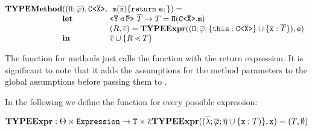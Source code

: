\documentclass[a4paper,USenglish,cleveref, autoref, thm-restate]{lipics-v2021}
\begin{document}
\begin{gather*}
\begin{array}{@{}l@{}l@{}l}
  \typeMethod & (\ensuremath{(\mv{\Pi} ; \overline{\fieldAssumption})}, \exptype{C}{\ol{X}},\ &\  \mathtt{m}(\ol{x})\{ \mathtt{ return }\ \texttt{e}; \}) =\\
              & \textbf{let} & \exptype{}{\ol{Y} \triangleleft \ol{P}}\ \overline{T} \to T  = \mv{\Pi} (\exptype{C}{\ol{X}}.\mv{m})
  \\
              & %
                                                                                              & ({R}, \constraints) =
                                                                                                \typeExpr((\mv\Pi ;
                                                                                                \overline{\fieldAssumption}; \set{\mv{this} :
                                                                                                \exptype{C}{\ol{X}} } \cup \set{ \ol{x} : \overline{{T}} }), \texttt{e})\\
              & \mathbf{in}
                                                                                              & \constraints \cup \set{{R} \lessdot {T}}\\
\end{array}
\end{gather*}

The \typeMethod{} function for methods just calls the \typeExpr{} function with the
return expression. It is significant to note that it adds the assumptions for the method parameters to the global assumptions before passing them to \typeExpr.

\smallskip

In the following we define the \typeExpr{} function for every possible expression:

\smallskip

\noindent
$\textbf{TYPEExpr}: \Theta \times
\texttt{Expression} \rightarrow \texttt{T} \times \mathit{\overline{c}}\\
\textbf{TYPEExpr} ((\overline{\mathtt{\lambda}} ; \overline{\mathtt{\varphi}}; \overline{\mathtt{\eta}}\cup \{ \mathtt{x} : {T}) \}, \mathtt{x}) = ({T} , \emptyset)
$

\smallskip
{}
\end{document}
